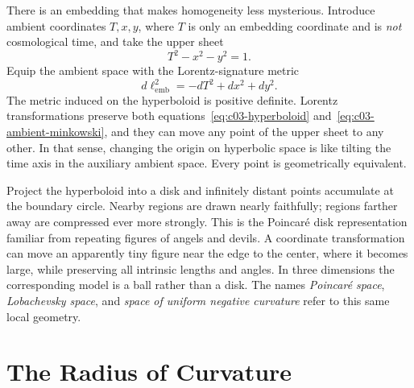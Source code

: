There is an embedding that makes homogeneity less mysterious. Introduce ambient coordinates \(T,x,y\), where \(T\) is only an embedding coordinate and is \emph{not} cosmological time, and take the upper sheet
\begin{equation}
T^2 - x^2 - y^2 = 1.
\label{eq:c03-hyperboloid}
\end{equation}
Equip the ambient space with the Lorentz-signature metric
\begin{equation}
d\ell_{\mathrm{emb}}^2=-dT^2+dx^2+dy^2.
\label{eq:c03-ambient-minkowski}
\end{equation}
The metric induced on the hyperboloid is positive definite. Lorentz transformations preserve both equations~\eqref{eq:c03-hyperboloid} and~\eqref{eq:c03-ambient-minkowski}, and they can move any point of the upper sheet to any other. In that sense, changing the origin on hyperbolic space is like tilting the time axis in the auxiliary ambient space. Every point is geometrically equivalent.

Project the hyperboloid into a disk and infinitely distant points accumulate at the boundary circle. Nearby regions are drawn nearly faithfully; regions farther away are compressed ever more strongly. This is the Poincar\'e disk representation familiar from repeating figures of angels and devils. A coordinate transformation can move an apparently tiny figure near the edge to the center, where it becomes large, while preserving all intrinsic lengths and angles. In three dimensions the corresponding model is a ball rather than a disk. The names \emph{Poincar\'e space}, \emph{Lobachevsky space}, and \emph{space of uniform negative curvature} refer to this same local geometry.

\begin{classroomqa}
\end{classroomqa}

\section{The Radius of Curvature}

